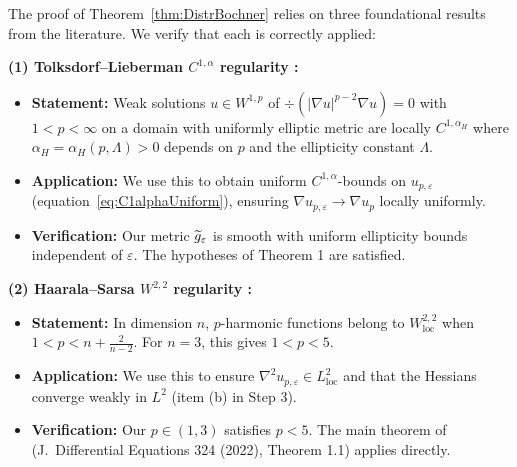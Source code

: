 \begin{remark}\label{rem:FoundationalVerification}
The proof of Theorem~\ref{thm:DistrBochner} relies on three foundational results from the literature. We verify that each is correctly applied:

\textbf{(1) Tolksdorf--Lieberman $C^{1,\alpha}$ regularity \cite{tolksdorf1984, lieberman1988}:}
\begin{itemize}
    \item \textbf{Statement:} Weak solutions $u \in W^{1,p}$ of $\div(|\nabla u|^{p-2}\nabla u) = 0$ with $1 < p < \infty$ on a domain with uniformly elliptic metric are locally $C^{1,\alpha_H}$ where $\alpha_H = \alpha_H(p, \Lambda) > 0$ depends on $p$ and the ellipticity constant $\Lambda$.
    \item \textbf{Application:} We use this to obtain uniform $C^{1,\alpha}$-bounds on $u_{p,\varepsilon}$ (equation~\eqref{eq:C1alphaUniform}), ensuring $\nabla u_{p,\varepsilon} \to \nabla u_p$ locally uniformly.
    \item \textbf{Verification:} Our metric $\widetilde{g}_\varepsilon$ is smooth with uniform ellipticity bounds independent of $\varepsilon$. The hypotheses of \cite{tolksdorf1984} Theorem 1 are satisfied.
\end{itemize}

\textbf{(2) Haarala--Sarsa $W^{2,2}$ regularity \cite{haaralasarsa2022}:}
\begin{itemize}
    \item \textbf{Statement:} In dimension $n$, $p$-harmonic functions belong to $W^{2,2}_{\mathrm{loc}}$ when $1 < p < n + \frac{2}{n-2}$. For $n = 3$, this gives $1 < p < 5$.
    \item \textbf{Application:} We use this to ensure $\nabla^2 u_{p,\varepsilon} \in L^2_{\mathrm{loc}}$ and that the Hessians converge weakly in $L^2$ (item (b) in Step 3).
    \item \textbf{Verification:} Our $p \in (1, 3)$ satisfies $p < 5$. The main theorem of \cite{haaralasarsa2022} (J.\ Differential Equations 324 (2022), Theorem 1.1) applies directly.
\end{itemize}


\end{remark}
